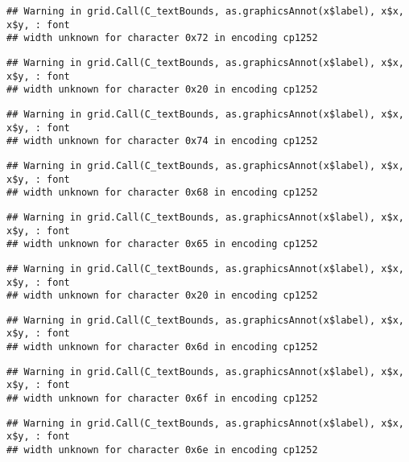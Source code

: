 \documentclass[
]{article}
\begin{document}
\begin{verbatim}
## Warning in grid.Call(C_textBounds, as.graphicsAnnot(x$label), x$x, x$y, : font
## width unknown for character 0x72 in encoding cp1252
\end{verbatim}

\begin{verbatim}
## Warning in grid.Call(C_textBounds, as.graphicsAnnot(x$label), x$x, x$y, : font
## width unknown for character 0x20 in encoding cp1252
\end{verbatim}

\begin{verbatim}
## Warning in grid.Call(C_textBounds, as.graphicsAnnot(x$label), x$x, x$y, : font
## width unknown for character 0x74 in encoding cp1252
\end{verbatim}

\begin{verbatim}
## Warning in grid.Call(C_textBounds, as.graphicsAnnot(x$label), x$x, x$y, : font
## width unknown for character 0x68 in encoding cp1252
\end{verbatim}

\begin{verbatim}
## Warning in grid.Call(C_textBounds, as.graphicsAnnot(x$label), x$x, x$y, : font
## width unknown for character 0x65 in encoding cp1252
\end{verbatim}

\begin{verbatim}
## Warning in grid.Call(C_textBounds, as.graphicsAnnot(x$label), x$x, x$y, : font
## width unknown for character 0x20 in encoding cp1252
\end{verbatim}

\begin{verbatim}
## Warning in grid.Call(C_textBounds, as.graphicsAnnot(x$label), x$x, x$y, : font
## width unknown for character 0x6d in encoding cp1252
\end{verbatim}

\begin{verbatim}
## Warning in grid.Call(C_textBounds, as.graphicsAnnot(x$label), x$x, x$y, : font
## width unknown for character 0x6f in encoding cp1252
\end{verbatim}

\begin{verbatim}
## Warning in grid.Call(C_textBounds, as.graphicsAnnot(x$label), x$x, x$y, : font
## width unknown for character 0x6e in encoding cp1252
\end{verbatim}
\end{document}
